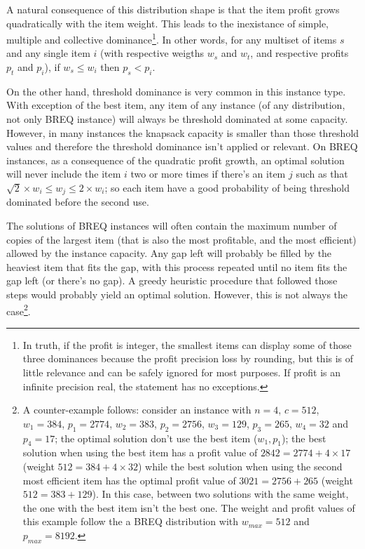 A natural consequence of this distribution shape is that the item profit grows quadratically with the item weight. This leads to the inexistance of simple, multiple and collective dominance\footnote{In truth, if the profit is integer, the smallest items can display some of those three dominances because the profit precision loss by rounding, but this is of little relevance and can be safely ignored for most purposes. If profit is an infinite precision real, the statement has no exceptions.}. In other words, for any multiset of items \(s\) and any single item \(i\) (with respective weigths \(w_s\) and \(w_t\), and respective profits \(p_t\) and \(p_i\)), if \(w_s \leq w_i\) then \(p_s < p_i\).

On the other hand, threshold dominance is very common in this instance type. With exception of the best item, any item of any instance (of any distribution, not only BREQ instance) will always be threshold dominated at some capacity. However, in many instances the knapsack capacity is smaller than those threshold values and therefore the threshold dominance isn't applied or relevant. On BREQ instances, as a consequence of the quadratic profit growth, an optimal solution will never include the item \(i\) two or more times if there's an item \(j\) such as that \(\sqrt{2} \times w_i \leq w_j \leq 2 \times w_i\); so each item have a good probability of being threshold dominated before the second use. 

The solutions of BREQ instances will often contain the maximum number of copies of the largest item (that is also the most profitable, and the most efficient) allowed by the instance capacity. Any gap left will probably be filled by the heaviest item that fits the gap, with this process repeated until no item fits the gap left (or there's no gap). A greedy heuristic procedure that followed those steps would probably yield an optimal solution. However, this is not always the case\footnote{A counter-example follows: consider an instance with \(n = 4\), \(c = 512\), \(w_1 = 384\), \(p_1 = 2774\), \(w_2 = 383\), \(p_2 = 2756\), \(w_3 = 129\), \(p_3 = 265\), \(w_4 = 32\) and \(p_4 = 17\); the optimal solution don't use the best item (\(w_1, p_1\)); the best solution when using the best item has a profit value of \(2842 = 2774 + 4\times17\) (weight \(512 = 384 + 4\times32\)) while the best solution when using the second most efficient item has the optimal profit value of \(3021 = 2756 + 265\) (weight \(512 = 383 + 129\)). In this case, between two solutions with the same weight, the one with the best item isn't the best one. The weight and profit values of this example follow the a BREQ distribution with \(w_{max} = 512\) and \(p_{max} = 8192\).}.

